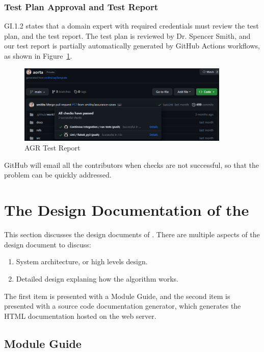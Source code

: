 \subsubsection{Test Plan Approval and Test Report}
GI.1.2 states that a domain expert with required credentials must review the test plan, and the test report. The test plan is reviewed by Dr. Spencer Smith, and our test report is partially automatically generated by GitHub Actions workflows, as shown in Figure~\ref{fig_agr_test_report}.

\begin{figure}[H]
    \centering
    \includegraphics[width=0.9\textwidth]{figures/AC/GI/test_report.png}
    \caption[AGR Test Report]{AGR Test Report}
    \label{fig_agr_test_report}
\end{figure}

GitHub will email all the contributors when checks are not successful, so that the problem can be quickly addressed.

\section{The Design Documentation of the \progname{}}

This section discusses the design documents of \progname{}. There are multiple aspects of the design document to discuss:

\begin{enumerate}
\item System architecture, or high levels design.
\item Detailed design explaning how the algorithm works.
\end{enumerate}

The first item is presented with a Module Guide, and the second item is presented with a source code documentation generator, which generates the HTML documentation hosted on the web server.

\subsection{Module Guide}

